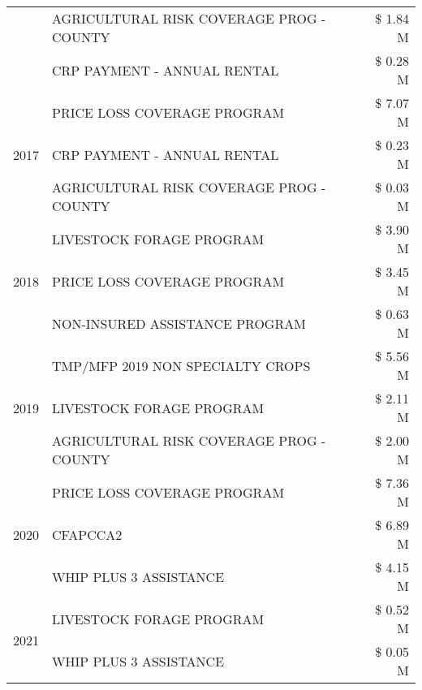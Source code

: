 \begin{tabular}{llr}
 & AGRICULTURAL RISK COVERAGE PROG - COUNTY & \$ 1.84 M \\
 & CRP PAYMENT - ANNUAL RENTAL & \$ 0.28 M \\
\cline{1-3}
\multirow[t]{3}{*}{2017} & PRICE LOSS COVERAGE PROGRAM & \$ 7.07 M \\
 & CRP PAYMENT - ANNUAL RENTAL & \$ 0.23 M \\
 & AGRICULTURAL RISK COVERAGE PROG - COUNTY & \$ 0.03 M \\
\cline{1-3}
\multirow[t]{3}{*}{2018} & LIVESTOCK FORAGE PROGRAM & \$ 3.90 M \\
 & PRICE LOSS COVERAGE PROGRAM & \$ 3.45 M \\
 & NON-INSURED ASSISTANCE PROGRAM & \$ 0.63 M \\
\cline{1-3}
\multirow[t]{3}{*}{2019} & TMP/MFP 2019 NON SPECIALTY CROPS & \$ 5.56 M \\
 & LIVESTOCK FORAGE PROGRAM & \$ 2.11 M \\
 & AGRICULTURAL RISK COVERAGE PROG - COUNTY & \$ 2.00 M \\
\cline{1-3}
\multirow[t]{3}{*}{2020} & PRICE LOSS COVERAGE PROGRAM & \$ 7.36 M \\
 & CFAPCCA2 & \$ 6.89 M \\
 & WHIP PLUS 3 ASSISTANCE & \$ 4.15 M \\
\cline{1-3}
\multirow[t]{2}{*}{2021} & LIVESTOCK FORAGE PROGRAM & \$ 0.52 M \\
 & WHIP PLUS 3 ASSISTANCE & \$ 0.05 M \\
\cline{1-3}
\bottomrule
\end{tabular}
